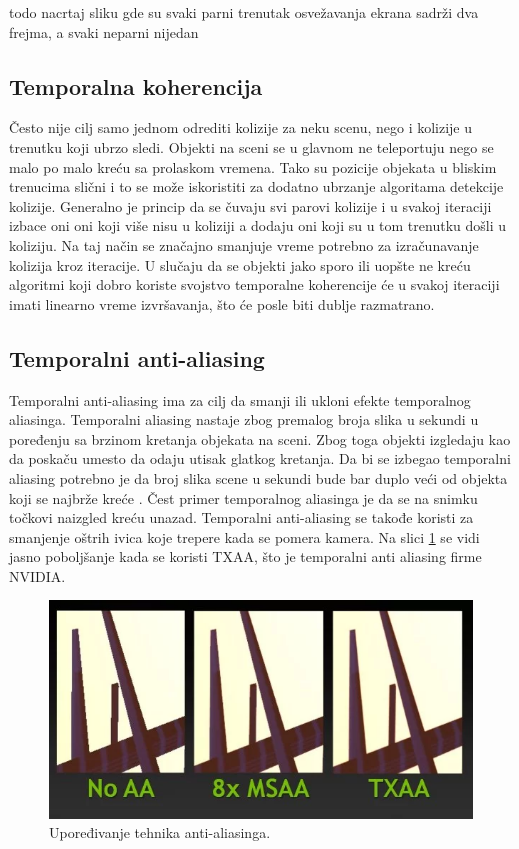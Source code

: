 \documentclass{article}
\begin{document}
{todo nacrtaj sliku gde su svaki parni trenutak osvežavanja ekrana sadrži dva frejma, a svaki neparni 
nijedan


\subsection{Temporalna koherencija}

Često nije cilj samo jednom odrediti kolizije za neku scenu, nego i kolizije u trenutku koji ubrzo sledi.
Objekti na sceni se u glavnom ne teleportuju nego se malo po malo kreću sa prolaskom vremena.
Tako su pozicije objekata u bliskim trenucima slični i to se može iskoristiti za dodatno ubrzanje algoritama 
detekcije kolizije. Generalno je princip da se čuvaju svi parovi kolizije i u svakoj iteraciji 
izbace oni oni koji više nisu u koliziji a dodaju oni koji su u tom trenutku došli u koliziju.
Na taj način se značajno smanjuje vreme potrebno za izračunavanje kolizija kroz iteracije.
U slučaju da se objekti jako sporo ili uopšte ne kreću algoritmi koji dobro koriste svojstvo temporalne 
koherencije će u svakoj iteraciji imati linearno vreme izvršavanja, što će posle biti dublje razmatrano. 


\subsection{Temporalni anti-aliasing}

Temporalni anti-aliasing ima za cilj da smanji ili ukloni efekte temporalnog aliasinga.
Temporalni aliasing nastaje zbog premalog broja slika u sekundi u poređenju sa brzinom kretanja objekata na sceni.
Zbog toga objekti izgledaju kao da poskaču  umesto da odaju utisak glatkog kretanja.
Da bi se izbegao temporalni aliasing potrebno je da broj slika scene u sekundi bude bar duplo veći 
od objekta koji se najbrže kreće \cite{Grant}. Čest primer temporalnog aliasinga je da se na snimku točkovi naizgled 
kreću unazad.
Temporalni anti-aliasing se takođe koristi za smanjenje oštrih ivica koje trepere kada se pomera kamera.
Na slici \ref{fig:txaa} se vidi jasno poboljšanje kada se koristi TXAA, što je temporalni anti
aliasing firme NVIDIA.

\begin{figure}[h!]
	\begin{center}
	\includegraphics[scale=0.45]{txaa.png}
	\end{center}
	\caption{Upoređivanje tehnika anti-aliasinga.}
	\label{fig:txaa}
\end{figure}

}
\end{document}
